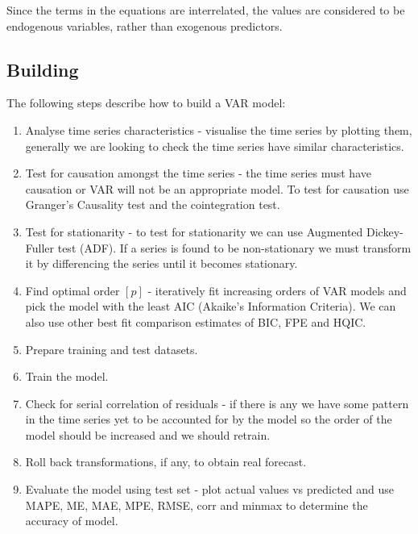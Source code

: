 \documentclass[11pt]{article}
\begin{document}
Since the terms in the equations are interrelated, the values are considered to be endogenous variables, rather than exogenous predictors.

\subsection{Building}
The following steps describe how to build a VAR model: \footnotemark[2]

\vspace{-0.25cm}
\begin{enumerate}
	\itemsep-0.2cm
	\item Analyse time series characteristics - visualise the time series by plotting them, generally we are looking to check the time series have similar characteristics.
	\item Test for causation amongst the time series - the time series must have causation or VAR will not be an appropriate model. To test for causation use Granger's Causality test and the cointegration test.
	\item Test for stationarity - to test for stationarity we can use Augmented Dickey-Fuller test (ADF). If a series is found to be non-stationary we must transform it by differencing the series until it becomes stationary.
	\item Find optimal order $[p]$ - iteratively fit increasing orders of VAR models and pick the model with the least AIC (Akaike’s Information Criteria). We can also use other best fit comparison estimates of BIC, FPE and HQIC.
	\item Prepare training and test datasets.
	\item Train the model.
	\item Check for serial correlation of residuals -  if there is any we have some pattern in the time series yet to be accounted for by the model so the order of the model should be increased and we should retrain.
	\item Roll back transformations, if any, to obtain real forecast.
	\item Evaluate the model using test set - plot actual values vs predicted and use MAPE, ME, MAE, MPE, RMSE, corr and minmax to determine the accuracy of model.
\end{enumerate} 
\end{document}
